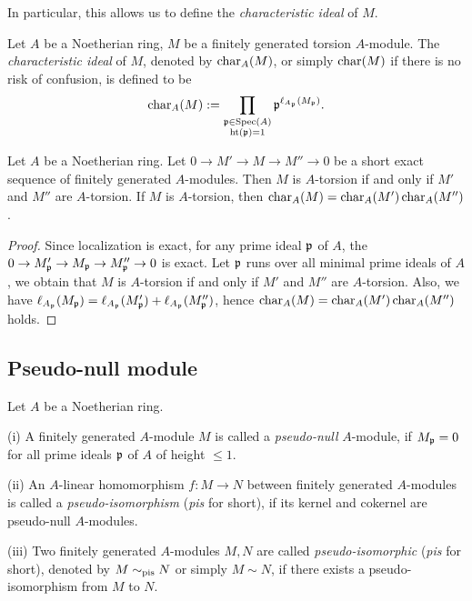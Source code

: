 In particular, this allows us to define the \emph{characteristic ideal} of $M$.

\begin{definition}
\label{char-ideal}
\leanok
Let $A$ be a Noetherian ring, $M$ be a
finitely generated torsion $A$-module.
The \emph{characteristic ideal} of $M$,
denoted by $\operatorname{char}_A(M)$, or simply $\operatorname{char}(M)$ if there is no risk of confusion, is defined to be
$$
\operatorname{char}_A(M):=\prod_{\substack{{\mathfrak{p}}\in{\mathrm{Spec}}(A)\\
{\mathrm{ht}}({\mathfrak{p}})=1}}{\mathfrak{p}}^{\ell_{A_{\mathfrak{p}}}(M_{\mathfrak{p}})}.
$$
\end{definition}

\begin{prop}
\label{char-ideal-additive}
\leanok
Let $A$ be a Noetherian ring.
Let $0\to M'\to M\to M''\to 0$ be a short exact sequence of finitely generated $A$-modules. Then $M$ is $A$-torsion if and only if $M'$ and $M''$ are $A$-torsion.
If $M$ is $A$-torsion, then $\operatorname{char}_A(M)=\operatorname{char}_A(M')\operatorname{char}_A(M'')$.
\end{prop}

\begin{proof}
\leanok
Since localization is exact, for any prime ideal ${\mathfrak{p}}$ of $A$,
the $0\to M_{\mathfrak{p}}'\to M_{\mathfrak{p}}\to M_{\mathfrak{p}}''\to 0$ is exact.
Let ${\mathfrak{p}}$ runs over all minimal prime ideals of $A$,
we obtain that $M$ is $A$-torsion if and only if $M'$ and $M''$ are $A$-torsion.
Also, we have $\ell_{A_{\mathfrak{p}}}(M_{\mathfrak{p}})=\ell_{A_{\mathfrak{p}}}(M_{\mathfrak{p}}')+\ell_{A_{\mathfrak{p}}}(M_{\mathfrak{p}}'')$,
hence $\operatorname{char}_A(M)=\operatorname{char}_A(M')\operatorname{char}_A(M'')$ holds.
\end{proof}

\subsection{Pseudo-null module}

\begin{definition}
\label{pseudo-null}
\leanok
Let $A$ be a Noetherian ring.

{\rm(i)}
A finitely generated $A$-module $M$ is called a \emph{pseudo-null} $A$-module,
if $M_{\mathfrak{p}}=0$ for all prime ideals ${\mathfrak{p}}$ of $A$ of height $\leq 1$.

{\rm(ii)}
An $A$-linear homomorphism $f:M\to N$ between finitely generated $A$-modules
is called a \emph{pseudo-isomorphism} (\emph{pis} for short),
if its kernel and cokernel are pseudo-null $A$-modules.

{\rm(iii)}
Two finitely generated $A$-modules $M,N$ are called
\emph{pseudo-isomorphic} (\emph{pis} for short),
denoted by $M\sim_{\mathrm{pis}} N$ or simply $M\sim N$,
if there exists a pseudo-isomorphism from $M$ to $N$.
\end{definition}


